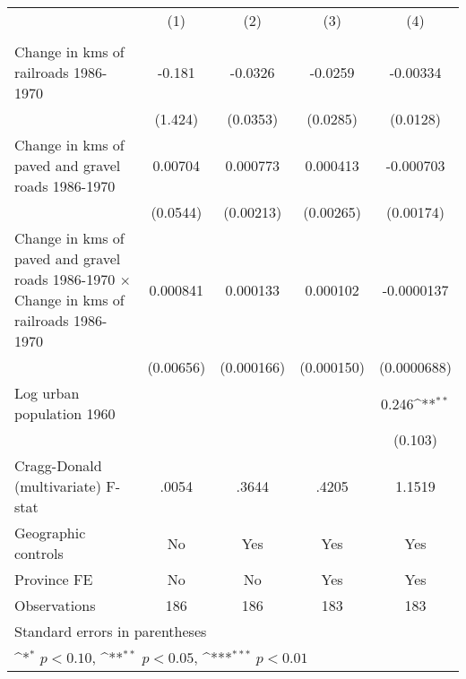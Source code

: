 {
\def\sym#1{\ifmmode^{#1}\else\(^{#1}\)\fi}
\begin{tabular}{l*{4}{c}}
\hline\hline
                &\multicolumn{1}{c}{(1)}&\multicolumn{1}{c}{(2)}&\multicolumn{1}{c}{(3)}&\multicolumn{1}{c}{(4)}\\
                &\multicolumn{1}{c}{}&\multicolumn{1}{c}{}&\multicolumn{1}{c}{}&\multicolumn{1}{c}{}\\
\hline
Change in kms of railroads 1986-1970&   -0.181         &  -0.0326         &  -0.0259         & -0.00334         \\
                &  (1.424)         & (0.0353)         & (0.0285)         & (0.0128)         \\
[1em]
Change in kms of paved and gravel roads 1986-1970&  0.00704         & 0.000773         & 0.000413         &-0.000703         \\
                & (0.0544)         &(0.00213)         &(0.00265)         &(0.00174)         \\
[1em]
Change in kms of paved and gravel roads 1986-1970 $\times$ Change in kms of railroads 1986-1970& 0.000841         & 0.000133         & 0.000102         &-0.0000137         \\
                &(0.00656)         &(0.000166)         &(0.000150)         &(0.0000688)         \\
[1em]
Log urban population 1960&                  &                  &                  &    0.246\sym{**} \\
                &                  &                  &                  &  (0.103)         \\
\hline
Cragg-Donald (multivariate) F-stat&    .0054         &    .3644         &    .4205         &   1.1519         \\
Geographic controls&       No         &      Yes         &      Yes         &      Yes         \\
Province FE     &       No         &       No         &      Yes         &      Yes         \\
Observations    &      186         &      186         &      183         &      183         \\
\hline\hline
\multicolumn{5}{l}{\footnotesize Standard errors in parentheses}\\
\multicolumn{5}{l}{\footnotesize \sym{*} \(p<0.10\), \sym{**} \(p<0.05\), \sym{***} \(p<0.01\)}\\
\end{tabular}
}
